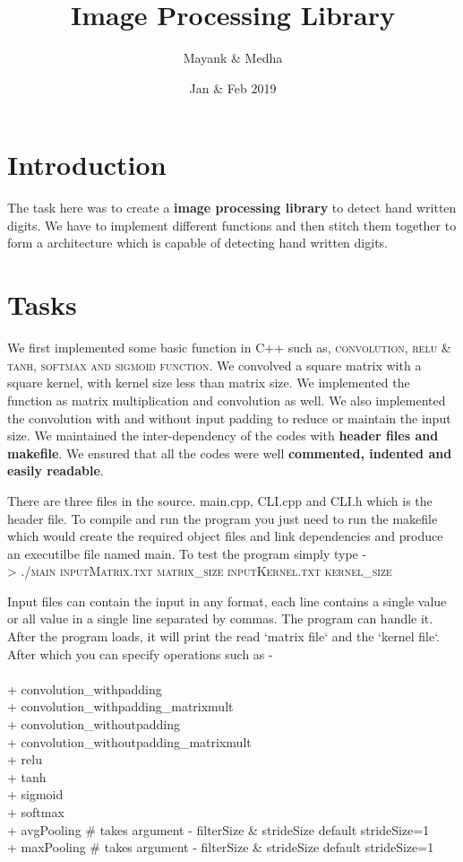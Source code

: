 \documentclass{article}
\title{Image Processing Library}
\author{Mayank \& Medha}
\date{Jan & Feb 2019}
\begin{document}
\maketitle

\section{Introduction}
The task here was to create a \textbf{image processing library} to detect hand written digits. We have to implement different functions and then stitch them together to form a architecture which is capable of detecting hand written digits.
\section{Tasks}
We first implemented some basic function in C++ such as, \textsc{convolution, relu & tanh, softmax and sigmoid function}. We convolved a square matrix with a square kernel, with kernel size less than matrix size. We implemented the function as matrix multiplication and convolution as well. We also implemented the convolution with and without input padding to reduce or maintain the input size. We maintained the inter-dependency of the codes with \textbf{header files and makefile}. We ensured that all the codes were well \textbf{commented, indented and easily readable}. 

There are three files in the source. main.cpp, CLI.cpp and CLI.h which is the header file. To compile and run the program you just need to run the makefile which would create the required object files and link dependencies and produce an executilbe file named main. To test the program simply type -\\
> \textsc{./main inputMatrix.txt matrix\_size inputKernel.txt kernel\_size}

Input files can contain the input in any format, each line contains a single value or all value in a single line separated by commas. The program can handle it. After the program loads, it will print the read `matrix file` and the `kernel file`. After which you can specify operations such as -\\
\\
+ convolution\_withpadding \\
+ convolution\_withpadding\_matrixmult \\
+ convolution\_withoutpadding \\
+ convolution\_withoutpadding\_matrixmult \\
+ relu \\
+ tanh \\
+ sigmoid \\
+ softmax \\
+ avgPooling # takes argument - filterSize & strideSize default strideSize=1 \\
+ maxPooling # takes argument - filterSize & strideSize default strideSize=1 \\
\end{document}
